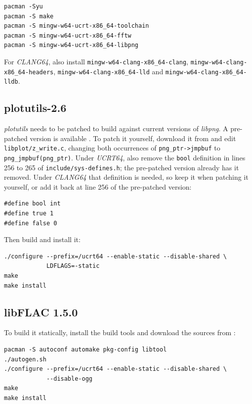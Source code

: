 \documentclass[10pt,a4paper]{report}
\begin{document}
\begin{appendices}
\begin{verbatim}
pacman -Syu
pacman -S make
pacman -S mingw-w64-ucrt-x86_64-toolchain
pacman -S mingw-w64-ucrt-x86_64-fftw
pacman -S mingw-w64-ucrt-x86_64-libpng
\end{verbatim}

For \textit{CLANG64}, also install \texttt{mingw-w64-clang-x86\_64-clang}, \texttt{mingw-w64-clang-x86\_64-headers}, \texttt{mingw-w64-clang-x86\_64-lld} and \texttt{mingw-w64-clang-x86\_64-lldb}.

\subsection{plotutils-2.6}

\textit{plotutils} needs to be patched to build against current versions of \textit{libpng}. A pre-patched version is available \cite{plotutilspatched}. To patch it yourself, download it from \cite{libplot} and edit \texttt{libplot/z\_write.c}, changing both occurrences of \texttt{png\_ptr->jmpbuf} to \texttt{png\_jmpbuf(png\_ptr)}. Under \textit{UCRT64}, also remove the \texttt{bool} definition in lines 256 to 265 of \texttt{include/sys-defines.h}; the pre-patched version already has it removed. Under \textit{CLANG64} that definition is needed, so keep it when patching it yourself, or add it back at line 256 of the pre-patched version:

\begin{verbatim}
#define bool int
#define true 1
#define false 0
\end{verbatim}

Then build and install it:

\begin{verbatim}
./configure --prefix=/ucrt64 --enable-static --disable-shared \
            LDFLAGS=-static
make
make install
\end{verbatim}

\subsection{libFLAC 1.5.0}

To build it statically, install the build tools and download the sources from \cite{libflac}:

\begin{verbatim}
pacman -S autoconf automake pkg-config libtool
./autogen.sh
./configure --prefix=/ucrt64 --enable-static --disable-shared \
            --disable-ogg
make
make install
\end{verbatim}


\end{appendices}
\end{document}
